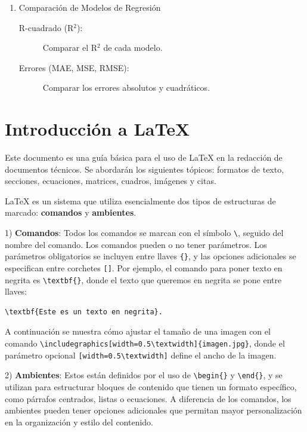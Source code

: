 \documentclass[12pt,letterpaper,spanish, twoside]{article}
\begin{document}
\begin{enumerate}
    \item Comparación de Modelos de Regresión
    \begin{description}
        \item[R-cuadrado (R$^2$):] Comparar el R$^2$ de cada modelo.
        \item[Errores (MAE, MSE, RMSE):] Comparar los errores absolutos y cuadráticos.
    \end{description}

\end{enumerate}

\newpage

\printbibliography

%

\newpage
\appendix
\section{Introducción a \LaTeX}
Este documento es una guía básica para el uso de \LaTeX{} en la redacción de documentos técnicos. Se abordarán los siguientes tópicos: formatos de texto, secciones, ecuaciones, matrices, cuadros, imágenes y citas.

\LaTeX{} es un sistema que utiliza esencialmente dos tipos de estructuras de marcado: \textbf{comandos} y \textbf{ambientes}.

1) \textbf{Comandos}: Todos los comandos se marcan con el símbolo \texttt{\textbackslash}, seguido del nombre del comando. Los comandos pueden o no tener parámetros. Los parámetros obligatorios se incluyen entre llaves \texttt{\{\}}, y las opciones adicionales se especifican entre corchetes \texttt{[]}. Por ejemplo, el comando para poner texto en negrita es \texttt{\textbackslash textbf\{\}}, donde el texto que queremos en negrita se pone entre llaves:

\ej
\begin{lstlisting}[caption={Fuente en negrita}, label={lst:basic:bold}]
\textbf{Este es un texto en negrita}.
\end{lstlisting}

\ej
A continuación se muestra cómo ajustar el tamaño de una imagen con el comando \texttt{\textbackslash includegraphics[width=0.5\textbackslash textwidth]\{imagen.jpg\}}, donde el parámetro opcional \texttt{[width=0.5\textbackslash textwidth]} define el ancho de la imagen.

2) \textbf{Ambientes}: Estos están definidos por el uso de \texttt{\textbackslash begin\{\}} y \texttt{\textbackslash end\{\}}, y se utilizan para estructurar bloques de contenido que tienen un formato específico, como párrafos centrados, listas o ecuaciones. A diferencia de los comandos, los ambientes pueden tener opciones adicionales que permitan mayor personalización en la organización y estilo del contenido. 
\end{document}
